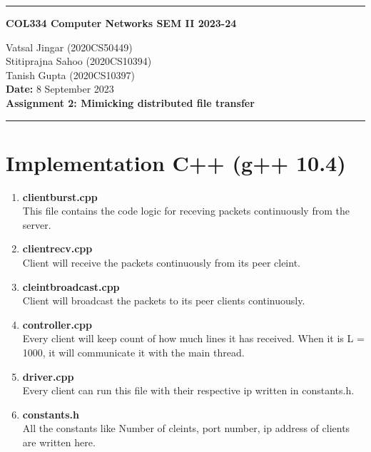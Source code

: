 \documentclass[12pt]{scrartcl}
\begin{document}
\onehalfspacing
\newcommand{\current}{June 2023}
\begin{center}
\hrule
\vspace{.4cm}
{\textbf { \large COL334 Computer Networks SEM II 2023-24}}
\end{center}
{
    \begin{center}
        Vatsal Jingar (2020CS50449)\\ Stitiprajna Sahoo (2020CS10394)\\ Tanish Gupta (2020CS10397)\\
        \textbf{Date:} 8 September 2023 \\
        \textbf{Assignment 2: Mimicking distributed file transfer}
    
    \end{center}
{ 
    \hrule
}
}
\section{Implementation C++ (g++ 10.4)}
\begin{enumerate}
    \item \textbf{clientburst.cpp}\\
    This file contains the code logic for receving packets continuously from the server.
    \item \textbf{clientrecv.cpp}\\
    Client will receive the packets continuously from its peer cleint.
    \item \textbf{cleintbroadcast.cpp}\\
    Client will broadcast the packets to its peer clients continuously.
    \item \textbf{controller.cpp}\\
    Every client will keep count of how much lines it has received. When it is L = 1000, it will communicate it with the main thread.
    \item \textbf{driver.cpp}\\
    Every client can run this file with their respective ip written in constants.h.
    \item \textbf{constants.h}\\
    All the constants like Number of cleints, port number, ip address of clients are written here.
\end{enumerate}
\end{document}
